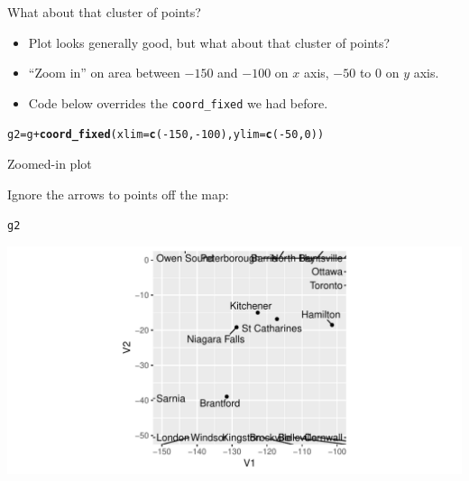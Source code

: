 \documentclass[unknownkeysallowed]{beamer}\usepackage[]{graphicx}\usepackage[]{color}
\makeatletter
\def\maxwidth{ %
  \ifdim\Gin@nat@width>\linewidth
    \linewidth
  \else
    \Gin@nat@width
  \fi
}
\newcommand{\hlnum}[1]{\textcolor[rgb]{0.686,0.059,0.569}{#1}}%
\newcommand{\hlopt}[1]{\textcolor[rgb]{0,0,0}{#1}}%
\newcommand{\hlstd}[1]{\textcolor[rgb]{0.345,0.345,0.345}{#1}}%
\newcommand{\hlkwb}[1]{\textcolor[rgb]{0.69,0.353,0.396}{#1}}%
\newcommand{\hlkwc}[1]{\textcolor[rgb]{0.333,0.667,0.333}{#1}}%
\newcommand{\hlkwd}[1]{\textcolor[rgb]{0.737,0.353,0.396}{\textbf{#1}}}%
\newenvironment{kframe}{%
 \def\at@end@of@kframe{}%
 \ifinner\ifhmode%
  \def\at@end@of@kframe{\end{minipage}}%
  \begin{minipage}{\columnwidth}%
 \fi\fi%
 \def\FrameCommand##1{\hskip\@totalleftmargin \hskip-\fboxsep
 \colorbox{shadecolor}{##1}\hskip-\fboxsep
     \hskip-\linewidth \hskip-\@totalleftmargin \hskip\columnwidth}%
 \MakeFramed {\advance\hsize-\width
   \@totalleftmargin\z@ \linewidth\hsize
   \@setminipage}}%
 {\par\unskip\endMakeFramed%
 \at@end@of@kframe}
\newenvironment{knitrout}{}{} %
\makeatother
\begin{document}
\begin{frame}[fragile]{What about that cluster of points?}

  \begin{itemize}
  \item Plot looks generally good, but what about that cluster of points?
  \item ``Zoom in'' on area between $-150$ and $-100$ on $x$ axis, $-50$ to 0 on
$y$ axis.
\item Code below overrides the \texttt{coord\_fixed} we had before.
  \end{itemize}


\begin{knitrout}\small
{}\color{fgcolor}\begin{kframe}
\begin{alltt}
\hlstd{g2} \hlkwb{=} \hlstd{g} \hlopt{+} \hlkwd{coord_fixed}\hlstd{(}\hlkwc{xlim}\hlstd{=}\hlkwd{c}\hlstd{(}\hlopt{-}\hlnum{150}\hlstd{,}\hlopt{-}\hlnum{100}\hlstd{),}\hlkwc{ylim}\hlstd{=}\hlkwd{c}\hlstd{(}\hlopt{-}\hlnum{50}\hlstd{,}\hlnum{0}\hlstd{))}
\end{alltt}


{\ttfamily\noindent\itshape\color{messagecolor}{\#\# Coordinate system already present. Adding new coordinate system, which will replace the existing one.}}\end{kframe}
\end{knitrout}

  
\end{frame}

\begin{frame}[fragile]{Zoomed-in plot}
 
Ignore the arrows to points off the map:


\begin{knitrout}
\color{fgcolor}\begin{kframe}
\begin{alltt}
\hlstd{g2}
\end{alltt}
\end{kframe}
\includegraphics[width=\maxwidth]{figure/spal-1} 

\end{knitrout}

\end{frame}
\end{document}

